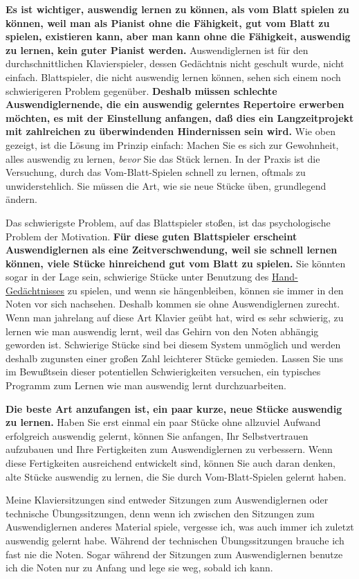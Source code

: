 \textbf{Es ist wichtiger, auswendig lernen zu können, als vom Blatt spielen zu können, weil man als Pianist ohne die Fähigkeit, gut vom Blatt zu spielen, existieren kann, aber man kann ohne die Fähigkeit, auswendig zu lernen, kein guter Pianist werden.}
Auswendiglernen ist für den durchschnittlichen Klavierspieler, dessen Gedächtnis nicht geschult wurde, nicht einfach.
Blattspieler, die nicht auswendig lernen können, sehen sich einem noch schwierigeren Problem gegenüber.
\textbf{Deshalb müssen schlechte Auswendiglernende, die ein auswendig gelerntes Repertoire erwerben möchten, es mit der Einstellung anfangen, daß dies ein Langzeitprojekt mit zahlreichen zu überwindenden Hindernissen sein wird.}
Wie oben gezeigt, ist die Lösung im Prinzip einfach: Machen Sie es sich zur Gewohnheit, alles auswendig zu lernen, \textit{bevor} Sie das Stück lernen.
In der Praxis ist die Versuchung, durch das Vom-Blatt-Spielen schnell zu lernen, oftmals zu unwiderstehlich.
Sie müssen die Art, wie sie neue Stücke üben, grundlegend ändern.

Das schwierigste Problem, auf das Blattspieler stoßen, ist das psychologische Problem der Motivation.
\textbf{Für diese guten Blattspieler erscheint Auswendiglernen als eine Zeitverschwendung, weil sie schnell lernen können, viele Stücke hinreichend gut vom Blatt zu spielen.}
Sie könnten sogar in der Lage sein, schwierige Stücke unter Benutzung des \hyperref[c1iii6d]{Hand-Gedächtnisses} zu spielen, und wenn sie hängenbleiben, können sie immer in den Noten vor sich nachsehen.
Deshalb kommen sie ohne Auswendiglernen zurecht.
Wenn man jahrelang auf diese Art Klavier geübt hat, wird es sehr schwierig, zu lernen wie man auswendig lernt, weil das Gehirn von den Noten abhängig geworden ist.
Schwierige Stücke sind bei diesem System unmöglich und werden deshalb zugunsten einer großen Zahl leichterer Stücke gemieden.
Lassen Sie uns im Bewußtsein dieser potentiellen Schwierigkeiten versuchen, ein typisches Programm zum Lernen wie man auswendig lernt durchzuarbeiten.

\textbf{Die beste Art anzufangen ist, ein paar kurze, neue Stücke auswendig zu lernen.}
Haben Sie erst einmal ein paar Stücke ohne allzuviel Aufwand erfolgreich auswendig gelernt, können Sie anfangen, Ihr Selbstvertrauen aufzubauen und Ihre Fertigkeiten zum Auswendiglernen zu verbessern.
Wenn diese Fertigkeiten ausreichend entwickelt sind, können Sie auch daran denken, alte Stücke auswendig zu lernen, die Sie durch Vom-Blatt-Spielen gelernt haben.

Meine Klaviersitzungen sind entweder Sitzungen zum Auswendiglernen oder technische Übungssitzungen, denn wenn ich zwischen den Sitzungen zum Auswendiglernen anderes Material spiele, vergesse ich, was auch immer ich zuletzt auswendig gelernt habe.
Während der technischen Übungssitzungen brauche ich fast nie die Noten.
Sogar während der Sitzungen zum Auswendiglernen benutze ich die Noten nur zu Anfang und lege sie weg, sobald ich kann.

